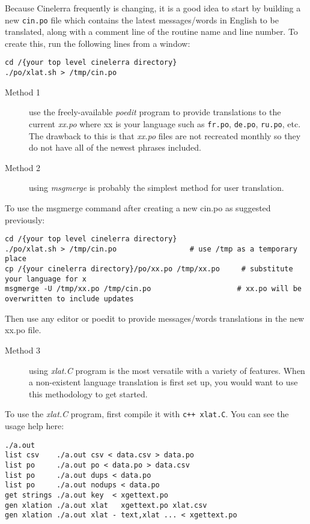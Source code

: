 Because Cinelerra frequently is changing, it is a good idea to start by building a new \texttt{cin.po} file which contains the latest messages/words in English to be translated, along with a comment line of the routine name and line number.  To create this, run the following lines from a window:

\begin{lstlisting}[numbers=none]
cd /{your top level cinelerra directory}
./po/xlat.sh > /tmp/cin.po
\end{lstlisting}

\begin{description}
	\item[Method 1]  use the freely-available \textit{poedit} program to provide translations to the current \textit{xx.po} where xx is your language such as \texttt{fr.po}, \texttt{de.po}, \texttt{ru.po}, etc.  The drawback to this is that \textit{xx.po} files are not recreated monthly so they do not have all of the newest phrases included.
	\item[Method 2] using \textit{msgmerge} is probably the simplest method for user translation.
\end{description}

To use the msgmerge command after creating a new cin.po as suggested previously:

\begin{lstlisting}[numbers=none]
cd /{your top level cinelerra directory}
./po/xlat.sh > /tmp/cin.po			       # use /tmp as a temporary place
cp /{your cinelerra directory}/po/xx.po /tmp/xx.po     # substitute your language for x
msgmerge -U /tmp/xx.po /tmp/cin.po                    # xx.po will be overwritten to include updates
\end{lstlisting}

Then use any editor or poedit to provide messages/words translations in the new xx.po file.

\begin{description}
	\item[Method 3 ] using \textit{xlat.C} program is the most versatile with a variety of features.  When a non-existent language translation is first set up, you would want to use this methodology to get started.
\end{description}

To use the \textit{xlat.C} program, first compile it with \texttt{c++ xlat.C}.  You can see the usage help here:

\begin{lstlisting}[numbers=none]
	./a.out 
list csv    ./a.out csv < data.csv > data.po
list po     ./a.out po < data.po > data.csv
list po     ./a.out dups < data.po
list po     ./a.out nodups < data.po
get strings ./a.out key  < xgettext.po
gen xlation ./a.out xlat   xgettext.po xlat.csv
gen xlation ./a.out xlat - text,xlat ... < xgettext.po
\end{lstlisting}

